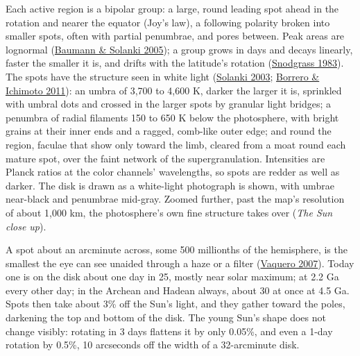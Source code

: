 \documentclass[9pt,twocolumn]{extarticle}
\begin{document}
Each active region is a bipolar group: a large, round leading spot ahead in the rotation and nearer the equator (Joy's law), a following polarity broken into smaller spots, often with partial penumbrae, and pores between. Peak areas are lognormal (\protect\hyperlink{cite.baumann2005}{Baumann \& Solanki 2005}); a group grows in days and decays linearly, faster the smaller it is, and drifts with the latitude's rotation (\protect\hyperlink{cite.snodgrass1983}{Snodgrass 1983}). The spots have the structure seen in white light (\protect\hyperlink{cite.solanki2003}{Solanki 2003}; \protect\hyperlink{cite.borrero2011}{Borrero \& Ichimoto 2011}): an umbra of 3,700 to 4,600 K, darker the larger it is, sprinkled with umbral dots and crossed in the larger spots by granular light bridges; a penumbra of radial filaments 150 to 650 K below the photosphere, with bright grains at their inner ends and a ragged, comb-like outer edge; and round the region, faculae that show only toward the limb, cleared from a moat round each mature spot, over the faint network of the supergranulation. Intensities are Planck ratios at the color channels' wavelengths, so spots are redder as well as darker. The disk is drawn as a white-light photograph is shown, with umbrae near-black and penumbrae mid-gray. Zoomed further, past the map's resolution of about 1,000 km, the photosphere's own fine structure takes over (\emph{The Sun close up}).

A spot about an arcminute across, some 500 millionths of the hemisphere, is the smallest the eye can see unaided through a haze or a filter (\protect\hyperlink{cite.vaquero2007}{Vaquero 2007}). Today one is on the disk about one day in 25, mostly near solar maximum; at 2.2 Ga every other day; in the Archean and Hadean always, about 30 at once at 4.5 Ga. Spots then take about 3\% off the Sun's light, and they gather toward the poles, darkening the top and bottom of the disk. The young Sun's shape does not change visibly: rotating in 3 days flattens it by only 0.05\%, and even a 1-day rotation by 0.5\%, 10 arcseconds off the width of a 32-arcminute disk.
\end{document}
